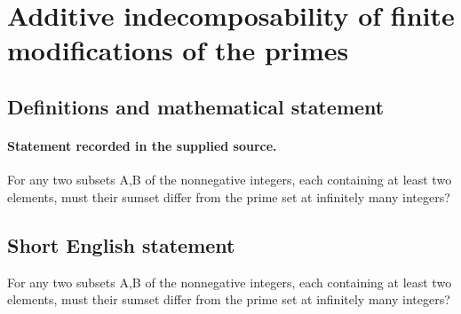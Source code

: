 \documentclass[11pt]{article}
\begin{document}
\section*{Additive indecomposability of finite modifications of the primes}\label{30007271}
\subsection{Definitions and mathematical statement}
\paragraph{Statement recorded in the supplied source.}
For any two subsets A,B of the nonnegative integers, each containing at least two elements, must their sumset differ from the prime set at infinitely many integers?
\subsection{Short English statement}
For any two subsets A,B of the nonnegative integers, each containing at least two elements, must their sumset differ from the prime set at infinitely many integers?
\end{document}
